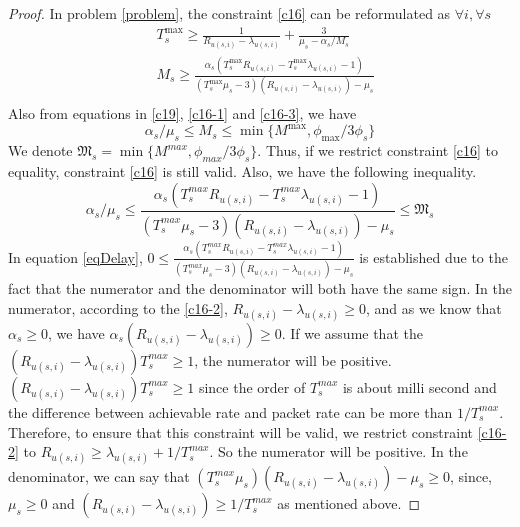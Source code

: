 \documentclass[lettersize,journal]{IEEEtran}
\begin{document}
\begin{proof}
In problem \eqref{problem}, the constraint \eqref{c16} can be reformulated as
$ \forall i,\forall s$
\begin{equation}
\begin{split}
&T^{\max}_s \geq\frac{1}{R_{u(s,i)} - \lambda_{u(s,i)}} + \frac{3}{\mu_s - \alpha_{s}/{M_s}}  \\
&M_s \geq \frac{\alpha_s(T^{\max}_s R_{u(s,i)}-T^{\max}_s\lambda_{u(s,i)} -1)}{(T^{\max}_s\mu_s-3)(R_{u(s,i)}-\lambda_{u(s,i)}) - \mu_s }\\
\end{split}
\end{equation}
Also from equations in \eqref{c19}, \eqref{c16-1} and \eqref{c16-3}, we have
\begin{equation}
\alpha_s/\mu_s\leq M_s \leq \min\{M^{\max}, \phi_{\max}/{3\phi_s}\}
\end{equation}
We denote $ \mathfrak{M}_s= \min\{M^{max}, \phi_{max}/{3\phi_s}\}$.
Thus, if we restrict constraint \eqref{c16} to equality, constraint \eqref{c16} is still valid.
Also, we have the following inequality.
\begin{equation}\label{eqDelay}
\alpha_s/\mu_s\leq \frac{\alpha_s(T^{max}_s R_{u(s,i)}-T^{max}_s\lambda_{u(s,i)} -1)}{(T^{max}_s\mu_s-3)(R_{u(s,i)}-\lambda_{u(s,i)}) - \mu_s } \leq \mathfrak{M}_s
\end{equation}
In equation \eqref{eqDelay}, $0\leq \frac{\alpha_s(T^{max}_s R_{u(s,i)}-T^{max}_s\lambda_{u(s,i)} -1)}{(T^{max}_s\mu_s-3)(R_{u(s,i)}-\lambda_{u(s,i)}) - \mu_s }$ is established due to the fact that 
the numerator and the denominator will both have the same sign.
In the numerator, according to the \eqref{c16-2}, $ R_{u(s,i)}-\lambda_{u(s,i)} \geq 0$, and as we know that $\alpha_s \geq 0$, we have $ \alpha_s (R_{u(s,i)}-\lambda_{u(s,i)}) \geq 0 $.
If we assume that the $(R_{u(s,i)}-\lambda_{u(s,i)})T^{max}_s \geq 1$, the numerator will be positive.
$(R_{u(s,i)}-\lambda_{u(s,i)})T^{max}_s \geq 1$ since the order of $T^{max}_s$ is about milli second and the difference between achievable rate and packet rate can be more than $1/T^{max}_s$.
Therefore, to ensure that this constraint will be valid, we restrict constraint \eqref{c16-2} to $R_{u(s,i)} \geq \lambda_{u(s,i)} + 1/T^{max}_s$.
So the numerator will be positive.
In the denominator, we can say that $(T^{max}_s\mu_s)(R_{u(s,i)}-\lambda_{u(s,i)}) - \mu_s \geq 0 $, since,  
$\mu_s \geq 0$ and
$(R_{u(s,i)}-\lambda_{u(s,i)}) \geq 1/T^{max}_s$ as mentioned above.

\end{proof}
\end{document}
